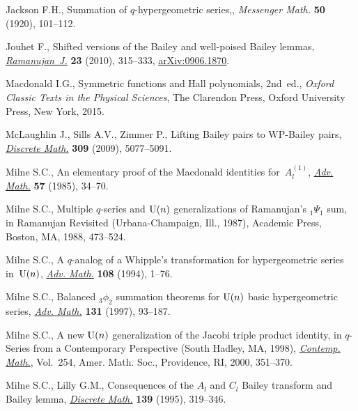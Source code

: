 \documentclass[pdftex]{sigma}
\numberwithin{equation}{section}
\begin{document}
\begin{thebibliography}{99}
Jackson F.H., Summation of {$q$}-hypergeometric series,, \textit{Messenger
 Math.} \textbf{50} (1920), 101--112.

Jouhet F., Shifted versions of the {B}ailey and well-poised {B}ailey lemmas,
 \href{https://doi.org/10.1007/s11139-010-9282-x}{\textit{Ramanujan~J.}} \textbf{23} (2010), 315--333, \href{https://arxiv.org/abs/0906.1870}{arXiv:0906.1870}.

Macdonald I.G., Symmetric functions and {H}all polynomials, 2nd~ed., \textit{Oxford
 Classic Texts in the Physical Sciences}, The Clarendon Press, Oxford
 University Press, New York, 2015.

McLaughlin J., Sills A.V., Zimmer P., Lifting {B}ailey pairs to {WP}-{B}ailey
 pairs, \href{https://doi.org/10.1016/j.disc.2009.03.015}{\textit{Discrete Math.}} \textbf{309} (2009), 5077--5091.

Milne S.C., An elementary proof of the {M}acdonald identities
 for~{$A^{(1)}_l$}, \href{https://doi.org/10.1016/0001-8708(85)90105-7}{\textit{Adv. Math.}} \textbf{57} (1985), 34--70.

Milne S.C., Multiple {$q$}-series and {${\rm U}(n)$} generalizations of
 {R}amanujan's {$_1\Psi_1$} sum, in Ramanujan Revisited ({U}rbana-{C}hampaign,
 {I}ll., 1987), Academic Press, Boston, MA, 1988, 473--524.

Milne S.C., A {$q$}-analog of a {W}hipple's transformation for hypergeometric
 series in~{${\rm U}(n)$}, \href{https://doi.org/10.1006/aima.1994.1065}{\textit{Adv. Math.}} \textbf{108} (1994), 1--76.

Milne S.C., Balanced {$_3\phi_2$} summation theorems for {${\rm U}(n)$} basic
 hypergeometric series, \href{https://doi.org/10.1006/aima.1997.1658}{\textit{Adv. Math.}} \textbf{131} (1997), 93--187.

Milne S.C., A new {${\rm U}(n)$} generalization of the {J}acobi triple product
 identity, in {$q$}-Series from a Contemporary Perspective ({S}outh {H}adley,
 {MA}, 1998), \href{https://doi.org/10.1090/conm/254/03961}{\textit{Contemp. Math.}}, Vol.~254, Amer. Math. Soc., Providence,
 RI, 2000, 351--370.

Milne S.C., Lilly G.M., Consequences of the {$A_l$} and {$C_l$} {B}ailey
 transform and {B}ailey lemma, \href{https://doi.org/10.1016/0012-365X(94)00139-A}{\textit{Discrete Math.}} \textbf{139} (1995),
 319--346.


\end{thebibliography}
\end{document}
